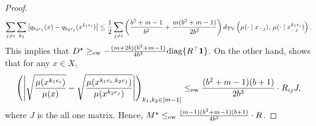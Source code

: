 \begin{proof}
    \begin{align*}
        \sum_{j\neq i}\sum_{k_2}\abs{q_{k_2 e_j}(x) - q_{k_2 e_j}(x^{k_1 e_i})}
        \leq \frac 12\sum_{j\neq i} \tp{\frac{b^2+m-1}{b^2} + \frac{m(b^2+m-1)}{2b^3}}\TV{\mu(\cdot\mid x_{-j})}{\mu(\cdot\mid x_{-j}^{k_1 e_i})}.
    \end{align*}
    This implies that $D^\star \geq_{\-{ew}} -\frac{(m+2b)(b^2+m-1)}{4b^3}\diag\{R^\top \*1\}$.
    On the other hand,  shows that
    for any $x \in X$,
    $$
        \tp{\abs{\sqrt{\frac{\mu(x^{k_1e_i})}{\mu(x)}}-\sqrt{\frac{\mu(x^{k_1e_i,k_2e_j})}{\mu(x^{k_2e_j})}}}}_{k_1,k_2\in [m-1]} \leq_{\-{ew}} \frac{(b^2+m-1)(b+1)}{2b^3}\cdot R_{ij} J,
    $$
    where $J$ is the all one matrix.
    Hence, $M^\star \leq_{\-{ew}} \frac{(m-1)(b^2+m-1)(b+1)}{4b^3} \cdot R$.
\end{proof}

